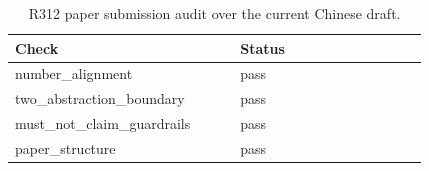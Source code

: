 \begin{table}[t]
  \centering
  \scriptsize
  \caption{R312 paper submission audit over the current Chinese draft.}
  \label{tab:r312-submission-audit}
  \begin{tabular}{p{0.44\linewidth}p{0.38\linewidth}}
    \toprule
    Check & Status \\
    \midrule
    number\_alignment & pass \\
    two\_abstraction\_boundary & pass \\
    must\_not\_claim\_guardrails & pass \\
    paper\_structure & pass \\
    \bottomrule
  \end{tabular}
\end{table}

